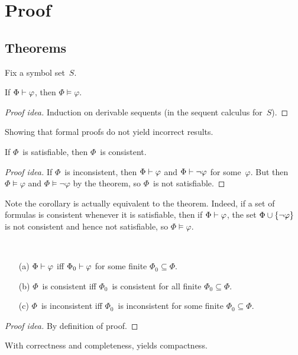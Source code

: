 %
%
%
\section{Proof}
\subsection*{Theorems}
Fix a symbol set~\(S\).
\begin{thm}[Correctness]
If \(\Phi\vdash\varphi\), then \(\Phi\models\varphi\).	
\end{thm}
\begin{proof}[Proof idea]
Induction on derivable sequents (in the sequent calculus for~\(S\)).
\end{proof}
\begin{app}
Showing that formal proofs do not yield incorrect results.
\end{app}
\begin{cor}[Correctness]
If \(\Phi\)~is satisfiable, then \(\Phi\)~is consistent.
\end{cor}
\begin{proof}[Proof idea]
If \(\Phi\)~is inconsistent, then \(\Phi\vdash\varphi\) and \(\Phi\vdash\lnot\varphi\) for some~\(\varphi\). But then \(\Phi\models\varphi\) and \(\Phi\models\lnot\varphi\) by the theorem, so \(\Phi\)~is not satisfiable.
\end{proof}

\begin{rmk}
Note the corollary is actually equivalent to the theorem. Indeed, if a set of formulas is consistent whenever it is satisfiable, then if \(\Phi\vdash\varphi\), the set \(\Phi\cup\{\lnot\varphi\}\) is not consistent and hence not satisfiable, so \(\Phi\models\varphi\).
\end{rmk}

\begin{thm}[Finiteness]
\ 
\begin{enumerate}[itemsep=0pt]
\item[(a)] \(\Phi\vdash\varphi\) iff \(\Phi_0\vdash\varphi\) for some finite \(\Phi_0\subseteq\Phi\).
\item[(b)] \(\Phi\)~is consistent iff \(\Phi_0\)~is consistent for all finite \(\Phi_0\subseteq\Phi\).
\item[(c)] \(\Phi\)~is inconsistent iff \(\Phi_0\)~is inconsistent for some finite \(\Phi_0\subseteq\Phi\).
\end{enumerate}
\end{thm}
\begin{proof}[Proof idea]
By definition of proof.
\end{proof}
\begin{app}
With correctness and completeness, yields compactness.
\end{app}
